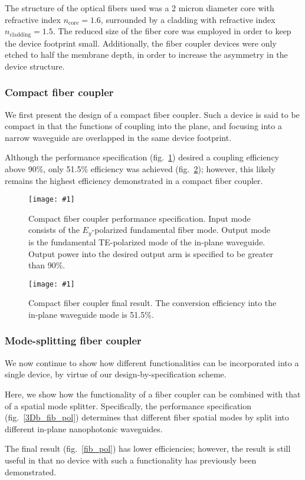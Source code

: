 \documentclass[letterpaper,10pt]{article}
\newcommand{\myfig}[2]{
    \begin{figure}[!h]
    \begin{centering}
    \texttt{[image: \#1]}
    \caption{#2}\label{#1}
    \end{centering}
    \end{figure}
}
\newcommand{\fig}[1]{fig.~\ref{#1}}
\begin{document}
The structure of the optical fibers used was a 2 micron diameter core with 
    refractive index $n_\text{core} = 1.6$,
    surrounded by a cladding with refractive index $n_\text{cladding}=1.5$.
The reduced size of the fiber core was employed in order
    to keep the device footprint small.
Additionally, the fiber coupler devices were only etched to half the membrane depth,
    in order to increase the asymmetry in the device structure.

\subsubsection{Compact fiber coupler}
We first present the design of a compact fiber coupler.
Such a device is said to be compact in that the functions
    of coupling into the plane, and focusing into a narrow waveguide
    are overlapped in the same device footprint.

Although the performance specification (\fig{3Db_fib_te})
    desired a coupling efficiency above 90\%,
    only 51.5\% efficiency was achieved (\fig{fib_te});
    however, this likely remains the highest efficiency demonstrated
    in a compact fiber coupler.

\myfig{3Db_fib_te}
    {Compact fiber coupler performance specification.
    Input mode consists of the $E_y$-polarized fundamental fiber mode.
    Output mode is the fundamental TE-polarized mode of the in-plane waveguide.
    Output power into the desired output arm is specified to be greater than 90\%.}
\myfig{fib_te}
    {Compact fiber coupler final result.
    The conversion efficiency into the in-plane waveguide mode is 51.5\%.}

\subsubsection{Mode-splitting fiber coupler}
We now continue to show how different functionalities
    can be incorporated into a single device,
    by virtue of our design-by-specification scheme.

Here, we show how the functionality of a fiber coupler
    can be combined with that of a spatial mode splitter.
Specifically, the performance specification (\fig{3Db_fib_pol})
    determines that different fiber spatial modes
    by split into different in-plane nanophotonic waveguides.

The final result (\fig{fib_pol}) has lower efficiencies;
    however, the result is still useful 
    in that no device with such a functionality has previously been demonstrated.
\end{document}

